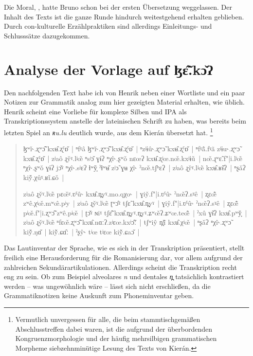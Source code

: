 \documentclass[
	12pt,
	ngerman,
]{scrartcl}
\newcommand{\fw}[1]{\textit{#1}} %
\newcommand{\Lhengko}{ɮɛ̃̂.kɔ̌ʔ}
\begin{document}
Die Moral, 
\autocite[77]{jacobs1894}, hatte Bruno schon bei der ersten Übersetzung
weggelassen. Der Inhalt des Texts ist die ganze Runde hindurch weitestgehend
erhalten geblieben. Durch con-kulturelle Erzählpraktiken sind allerdings
Einleitungs- und Schlusssätze dazugekommen.


\section{Analyse der Vorlage auf \Lhengko}
\label{sec:lhenganalys}

Den nachfolgenden Text habe ich von Henrik neben einer Wortliste und ein paar
Notizen zur Grammatik analog zum hier gezeigten Material erhalten, wie üblich.
Henrik scheint eine Vorliebe für komplexe Silben und IPA als
Transkriptionssystem anstelle der lateinischen Schrift zu haben, was bereits
beim letzten Spiel an \fw{ʀu.lu} deutlich wurde, aus dem Kierán übersetzt hat.%
%
	\footnote{Vermutlich unvergessen für alle, die beim stammtischgemäßen
	Abschlusstreffen dabei waren, ist die aufgrund der überbordenden
	Kongruenzmorphologie und der häufig mehrsilbigen grammatischen Morpheme
	siebzehn\-minütige Lesung des Texts von Kierán.}
%

\begin{quote}
\begin{sloppypar}
	ɮʷǐ˞.ʐʷɔ̃̂ kxʉ̂.ʐˤɒ̌~|
	ⁿfˠâ ɮʷǐ˞.ʐʷɔ̃̂ kxʉ̂.ʐˤɒ̌~|
	ⁿzʲɨû˞.ʐʷɔ̃ kxʉ̂.ʐˤɒ̌~|
	ⁿfˠã̂.fˠã zʲɨu˞.ʐʷɔ̃ kxʉ̂.ʐˤɒ̌~|
	zʲaô ɻy̌ˠ.lʲœ̃ ⁿsʲɔ̌ ɣɨʔ ⁿχî˞.ʂʷǒ nɛœʔ kxʉ̂.ʐʲœ.nœ̌.kxʲɨũ~|
	nœ̌.ɻʷɛ̃.f"|i.lʲœ̃ ⁿχî˞.ʂʷǒ ɣɨʔ jɔ̌ˠ ⁿχî˞.sʲɛʔ ɬʷy̟̌ ˀɬʷʉ̌ zʲɔ̃ ɣʉ χî˞ ˀnœ̌.tʃʰɛʔ~|
	zʲaô ɻy̌ˠ.lʲœ̃ kxʉ̂.ʁɨ̌ʔ~|
	ⁿʂǎʔ kiỹ̌.χûˠ.ʁĩ.ɕǒ~|
	
	zʲaô ɻy̌ˠ.lʲœ̃ pɛœ̌ˠ.ʋˤû˞ kxʉ̂.n̪yˠ.mo.qχo˞~|
	ɣiy̌.f"|i.ʋˤû˞ ˀnœ̌ʔ.sˠê~|
	ʐɛœ̃̂ zʷê.χʲœ̌.mʷœ̂.pʲy~|
	zʲaô ɻy̌ˠ.lʲœ̃ ʈʷɔ̂ˠ tʃɛ̃ kxʉ̂.n̪yˠ~|
	ɣiy̌.f"|i.ʋˤû˞ ˀnœ̌ʔ.sˠê~|
	ʐɛœ̃̂ pʲœ̌.f"|i.ʐʷɔ̃̂ zʷê.pʲœ̌~|
	ʈɔ̌ˠ ɴiˠ tʃɛ̃̂ kxʉ̂.n̪yˠ.n̪yˠ.ʑʷœ̌ʔ.ʑʷœ.teœ̃̂~|
	ˀxû ɣɨ̌ʔ kxʉ̂.pʷy̟̌~|
	zʲaô ɻy̌ˠ.lʲœ̃ ⁿfɛœ̌.ʐʷɔ̃̂ kxʉ̂.nɑːʔ.zʲɛœ.kxʲɔ̃̂ː~|
	tʃʷiŷ n̪ʲĩ̌ kxʉ̂.χʲœ̌~|
	ⁿʂǎʔ ⁿχî˞.ʐʷɔ̃ kiỹ̌.ŋɑ̌~|
	kiỹ̌.ɕɑ̂ː~|
	ˀʂŷ˞ tʲœ tʲɛœ kiỹ̌.ɕaɔ̌~|
\end{sloppypar}
\end{quote}

Das Lautinventar der Sprache, wie es sich in der Transkription präsentiert,
stellt freilich eine Herausforderung für die Romanisierung dar, vor allem
aufgrund der zahlreichen Sekundärartikulationen. Allerdings scheint die
Transkription recht eng zu sein. Ob zum Beispiel alveolares \emph{n} und
dentales \emph{n̪} tatsächlich kontrastiert werden -- was ungewöhnlich wäre --
lässt sich nicht erschließen, da die Grammatiknotizen keine Auskunft zum
Phoneminventar geben.
\end{document}
